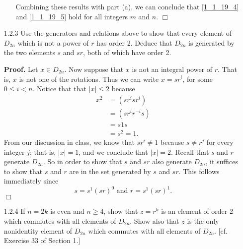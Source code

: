 \documentclass[9pt]{article}
\newcommand{\qed}{\hfill \ensuremath{\Box}}
\begin{document}
\begin{enumerate}
\begin{enumerate}
               Combining these results with part (a), we can conclude that
               \eqref{1_1_19_4} and \eqref{1_1_19_5} hold for all integers $m$
               and $n$. \qed
      \end{enumerate}
   \item[1.2.3]   Use the generators and relations above to show that every
                  element of $D_{2n}$ which is not a power of $r$ has order 2.
                  Deduce that $D_{2n}$ is generated by the two elements $s$ and
                  $sr$, both of which have order 2.
                  
      \textbf{Proof.} Let $x \in D_{2n}$. Now suppose that $x$ is not an
      integral power of $r$. That is, $x$ is not one of the rotations. Thus
      we can write $x = sr^i$, for some $0 \le i < n$. Notice that that
      $|x| \le 2$ because
      \begin{align*}
         x^2 &= (sr^isr^i) \\
             &= (sr^ir^{-i}s) \\
             &= s1s \\
             &= s^2 = 1.
      \end{align*}
      From our discussion in class, we know that $sr^i \neq 1$ because
      $s \neq r^j$ for every integer $j$; that is, $|x| = 1$, and we conclude
      that $|x| = 2$. Recall that $s$ and $r$ generate $D_{2n}$. So in order to
      show that $s$ and $sr$ also generate $D_{2n}$, it suffices to show that
      $s$ and $r$ are in the set generated by $s$ and $sr$. This follows
      immediately since
      $$s = s^1(sr)^0 \text{ and } r = s^1(sr)^1.$$ \qed
   \item[1.2.4]   If $n = 2k$ is even and $n \ge 4$, show that $z = r^k$ is an
                  element of order 2 which commutes with all elements of
                  $D_{2n}$. Show also that $z$ is the only nonidentity element
                  of $D_{2n}$ which commutes with all elements of $D_{2n}$. [cf.
                  Exercise 33 of Section 1.]
                  

\end{enumerate}
\end{document}
